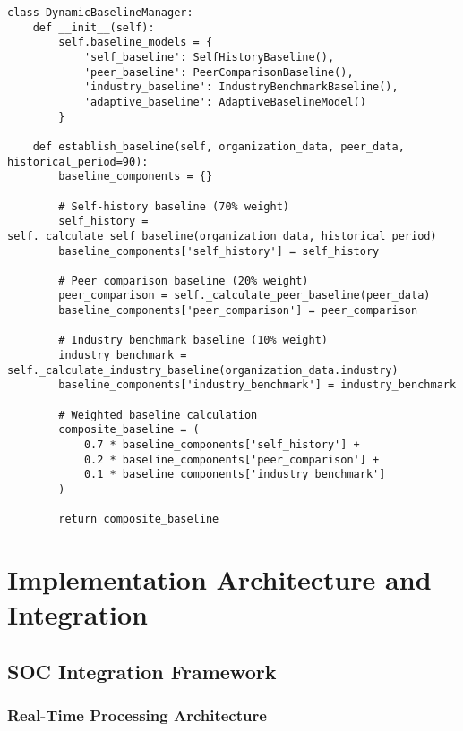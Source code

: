 \documentclass[11pt, onecolumn]{article}
\begin{document}
\begin{lstlisting}
class DynamicBaselineManager:
    def __init__(self):
        self.baseline_models = {
            'self_baseline': SelfHistoryBaseline(),
            'peer_baseline': PeerComparisonBaseline(),
            'industry_baseline': IndustryBenchmarkBaseline(),
            'adaptive_baseline': AdaptiveBaselineModel()
        }
        
    def establish_baseline(self, organization_data, peer_data, historical_period=90):
        baseline_components = {}
        
        # Self-history baseline (70% weight)
        self_history = self._calculate_self_baseline(organization_data, historical_period)
        baseline_components['self_history'] = self_history
        
        # Peer comparison baseline (20% weight)
        peer_comparison = self._calculate_peer_baseline(peer_data)
        baseline_components['peer_comparison'] = peer_comparison
        
        # Industry benchmark baseline (10% weight)
        industry_benchmark = self._calculate_industry_baseline(organization_data.industry)
        baseline_components['industry_benchmark'] = industry_benchmark
        
        # Weighted baseline calculation
        composite_baseline = (
            0.7 * baseline_components['self_history'] +
            0.2 * baseline_components['peer_comparison'] +
            0.1 * baseline_components['industry_benchmark']
        )
        
        return composite_baseline
\end{lstlisting}

\section{Implementation Architecture and Integration}

\subsection{SOC Integration Framework}

\subsubsection{Real-Time Processing Architecture}
\end{document}

